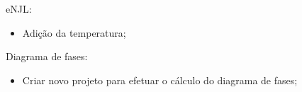 eNJL:
\begin{itemize}
	\item Adição da temperatura;
\end{itemize}

Diagrama de fases:
\begin{itemize}
	\item Criar novo projeto para efetuar o cálculo do diagrama de fases;
\end{itemize}
